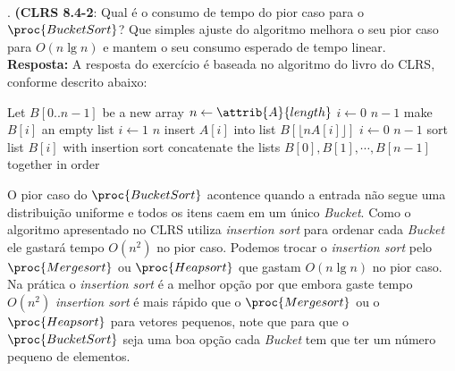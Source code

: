 \\[12pt]
. \textbf{(CLRS 8.4-2}: Qual é o consumo de tempo do pior caso para o $\proc{BucketSort}$? Que simples ajuste do algoritmo melhora o seu pior caso para $O(n \lg n)$ e mantem o seu consumo esperado de tempo linear.
\\[6pt]
\noindent \textbf{Resposta:} A resposta do exercício é baseada no algoritmo do livro do CLRS, conforme descrito abaixo:

\begin{codebox}
 \li Let $B[0..n-1]$ be a new array
 \li $n \gets \attrib{A}{length}$
 \li \For $i \gets 0$ \To $n-1$
 \li    \Do
	  make $B[i]$ an empty list
	\End
 \li \For $i \gets 1$ \To $n$
 \li	\Do
	  insert $A[i]$ into list $B[\lfloor nA[i] \rfloor]$
	\End
 \li \For $i \gets 0$ \To $n-1$
 \li	\Do
	  sort list $B[i]$ with insertion sort
	\End
 \li concatenate the lists $B[0], B[1], \cdots, B[n-1]$ together in order
\end{codebox}

\noindent O pior caso do $\proc{BucketSort}$ acontence quando a entrada não segue uma distribuição uniforme e todos os itens caem em um único \textit{Bucket}. Como o algoritmo apresentado no CLRS utiliza \textit{insertion sort} para ordenar cada \textit{Bucket} ele gastará tempo $O(n^2)$ no pior caso. Podemos trocar o \textit{insertion sort} pelo $\proc{Mergesort}$ ou $\proc{Heapsort}$ que gastam $O(n \lg n)$ no pior caso. Na prática o \textit{insertion sort} é a melhor opção por que embora gaste tempo $O(n^2)$ \textit{insertion sort} é mais rápido que o $\proc{Mergesort}$ ou o $\proc{Heapsort}$ para vetores pequenos, note que para que o $\proc{BucketSort}$ seja uma boa opção cada \textit{Bucket} tem que ter um número pequeno de elementos.
